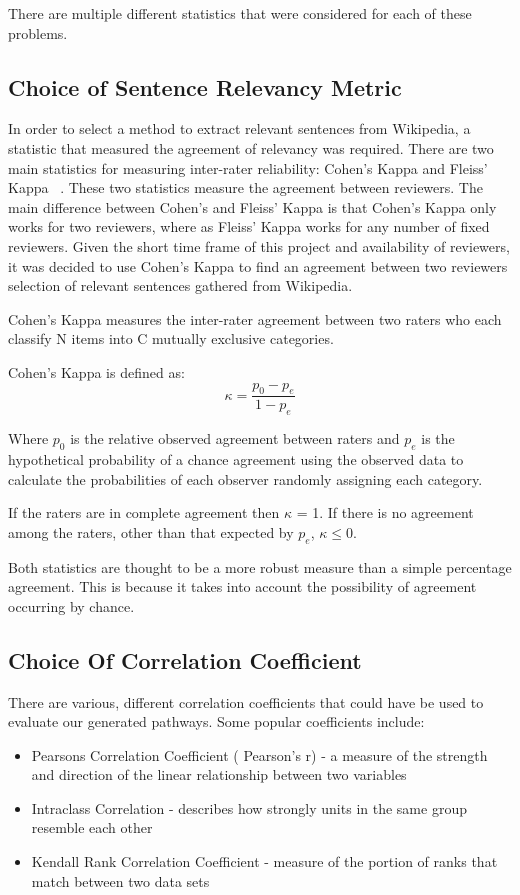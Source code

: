 \documentclass[bsc,frontabs,twoside,singlespacing,parskip,deptreport]{infthesis}     %
\begin{document}
There are multiple different statistics that were considered for each of these problems.
\subsection{Choice of Sentence Relevancy Metric}\label{sec:cohen}
In order to select a method to extract relevant sentences from Wikipedia, a statistic that measured the agreement
of relevancy was required. There are two main statistics for measuring inter-rater reliability: Cohen's Kappa and Fleiss' Kappa ~\cite{gwet2014handbook}.
These two statistics measure the agreement between reviewers. The main difference between Cohen's and Fleiss' Kappa is that
Cohen's Kappa only works for two reviewers, where as Fleiss' Kappa works for any number of fixed reviewers.
Given the short time frame of this project and availability of reviewers, it was decided to use Cohen's Kappa
to find an agreement between two reviewers selection of relevant sentences gathered from Wikipedia.

Cohen's Kappa measures the inter-rater agreement between two raters
who each classify N items into C mutually exclusive categories.

Cohen's Kappa is defined as:\\
\begin{equation}
  \kappa = \frac{p_{0} - p_{e}}{1 - p_{e}}\nonumber
\end{equation}

Where $p_0$ is the relative observed agreement between raters and $p_e$ is the hypothetical probability
of a chance agreement using the observed data to calculate the probabilities of each observer randomly assigning each category.

If the raters are in complete agreement then $\kappa$ = 1.
If there is no agreement among the raters, other than that expected by $p_e$, $\kappa \leq 0$.

Both statistics are thought to be a more robust measure than a simple percentage agreement.
This is because it takes into account the possibility of agreement occurring by chance.

\subsection{Choice Of Correlation Coefficient}\label{sec:kendall}

There are various, different correlation coefficients that could have be used to evaluate our generated pathways.
Some popular coefficients include:
\begin{itemize}
\item Pearsons Correlation Coefficient ( Pearson's r) - a measure of the strength and direction of the linear relationship between two variables
\item Intraclass Correlation - describes how strongly units in the same group resemble each other
\item Kendall Rank Correlation Coefficient -  measure of the portion of ranks that match between two data sets
\end{itemize}
\end{document}
